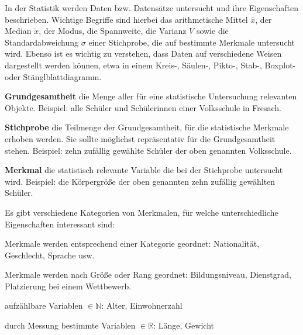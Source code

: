 



\thispagestyle{plain}



In der Statistik werden Daten bzw. Datens\"{a}tze untersucht und ihre Eigenschaften beschrieben. Wichtige Begriffe sind hierbei das arithmetische Mittel $\bar{x}$, der Median $\tilde{x}$, der Modus, die Spannweite, die Varianz $V$ sowie die Standardabweichung $\sigma$ einer Stichprobe, die auf bestimmte Merkmale untersucht wird. Ebenso ist es wichtig zu verstehen, dass Daten auf verschiedene Weisen dargestellt werden k\"{o}nnen, etwa in einem Kreis-, S\"{a}ulen-, Pikto-, Stab-, Boxplot- oder St\"{a}nglblattdiagramm. 


\textbf{Grundgesamtheit}  die Menge aller f\"{u}r eine statistische Untersuchung relevanten Objekte. Beispiel: alle Sch\"{u}ler und Sch\"{u}lerinnen einer Volksschule in Fresach.

\textbf{Stichprobe}  die Teilmenge der Grundgesamtheit, f\"{u}r die statistische Merkmale erhoben werden. Sie sollte m\"{o}glichst repr\"{a}sentativ f\"{u}r die Grundgesamtheit stehen. Beispiel: zehn zuf\"{a}llig gew\"{a}hlte Sch\"{u}ler der oben genannten Volksschule.

\textbf{Merkmal}  die statistisch relevante Variable die bei der Stichprobe untersucht wird. Beispiel: die K\"{o}rpergr\"{o}\ss{}e der oben genannten zehn zuf\"{a}llig gew\"{a}hlten Sch\"{u}ler. 

Es gibt verschiedene Kategorien von Merkmalen, f\"{u}r welche unterschiedliche Eigenschaften interessant sind:

\begin{itemize}


	Merkmale werden entsprechend einer Kategorie geordnet: Nationalit\"{a}t, Geschlecht, Sprache usw.


	Merkmale werden nach Gr\"{o}\ss{}e oder Rang geordnet: Bildungsniveau, Dienstgrad, Platzierung bei einem Wettbewerb.


		\begin{itemize}

			  aufz\"{a}hlbare Variablen $\in \mathbb{N}$: Alter, Einwohnerzahl

			  durch Messung bestimmte Variablen $\in \mathbb{R}$: L\"{a}nge, Gewicht

		\end{itemize}

\end{itemize}

